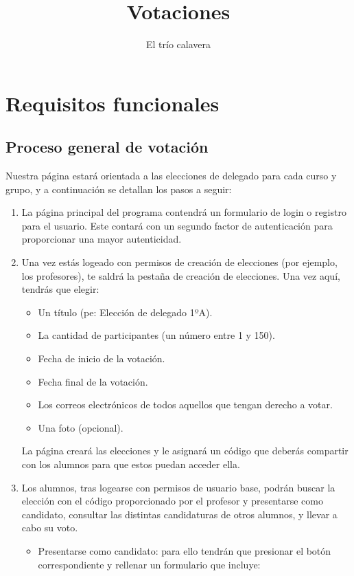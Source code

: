 \documentclass{article}
\title{Votaciones}
\author{El trío calavera}
\begin{document}
\maketitle

\tableofcontents
\newpage

\section{Requisitos funcionales}
    \subsection{Proceso general de votación}
    Nuestra página estará orientada a las elecciones de delegado para cada curso y grupo, y a continuación se detallan los pasos a seguir:
    \begin{enumerate}
        \item La página principal del programa contendrá un formulario de login o registro para el usuario. Este contará con
        un segundo factor de autenticación para proporcionar una mayor autenticidad.
        \item Una vez estás logeado con permisos de creación de elecciones (por ejemplo, los profesores), te saldrá la pestaña de creación
        de elecciones. Una vez aquí, tendrás que elegir:
        \begin{itemize}
            \item Un título (pe: Elección de delegado 1ºA).
            \item La cantidad de participantes (un número entre 1 y 150).
            \item Fecha de inicio de la votación.
            \item Fecha final de la votación.
            \item Los correos electrónicos de todos aquellos que tengan derecho a votar.
            \item Una foto (opcional).
        \end{itemize}
        La página creará las elecciones y le asignará un código que deberás compartir con los alumnos para que estos puedan acceder ella.
        \item Los alumnos, tras logearse con permisos de usuario base, podrán buscar la elección con el código proporcionado por el
        profesor y presentarse como candidato, consultar las distintas candidaturas de otros alumnos, y llevar a cabo su voto.
        \begin{itemize}
            \item Presentarse como candidato: para ello tendrán que presionar el botón correspondiente y rellenar un formulario que incluye:

\end{itemize}
\end{enumerate}
\end{document}
